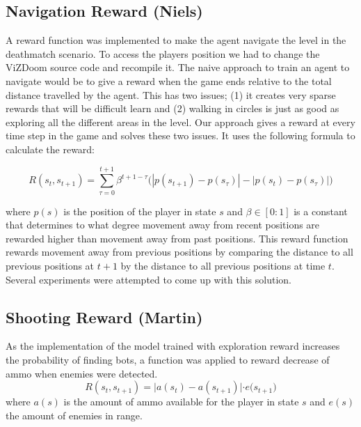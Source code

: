 \documentclass{article}
\begin{document}

\subsection{Navigation Reward (Niels)}
\label{sec:navigation}
A reward function was implemented to make the agent navigate the level in the deathmatch scenario. To access the players position we had to change the ViZDoom source code and recompile it. The naive approach to train an agent to navigate would be to give a reward when the game ends relative to the total distance travelled by the agent. This has two issues; (1) it creates very sparse rewards that will be difficult learn and (2) walking in circles is just as good as exploring all the different areas in the level. Our approach gives a reward at every time step in the game and solves these two issues. It uses the following formula to calculate the reward:

\begin{equation}
R(s_{t}, s_{t+1}) = \sum_{\tau = 0}^{t+1} \beta^{t+1-\tau} \big(|p(s_{t+1}) - p(s_{\tau})| - |p(s_{t}) - p(s_{\tau})|\big)
\end{equation}

where $p(s)$ is the position of the player in state $s$ and $\beta \in [0:1]$ is a constant that determines to what degree movement away from recent positions are rewarded higher than movement away from past positions. This reward function rewards movement away from previous positions by comparing the distance to all previous positions at $t+1$ by the distance to all previous positions at time $t$. Several experiments were attempted to come up with this solution. 

\subsection{Shooting Reward (Martin)}
As the implementation of the model trained with exploration reward increases the probability of finding bots, a function was applied to reward decrease of ammo when enemies were detected. 
\begin{equation}
R(s_{t}, s_{t+1}) = \big|a(s_{t}) - a(s_{t+1})| \cdot e(s_{t+1}\big)
\end{equation}
where $a(s)$ is the amount of ammo available for the player in state $s$ and $e(s)$ the amount of enemies in range. 
\end{document}

